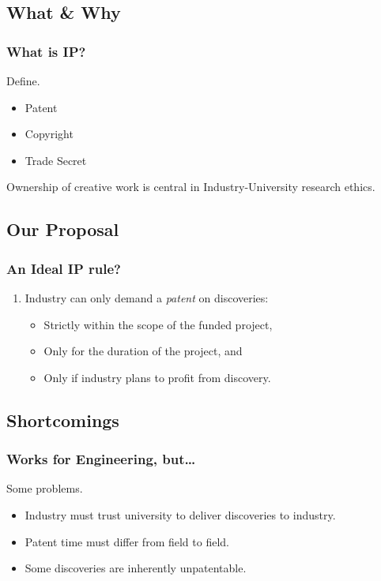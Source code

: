 \subsection{What \& Why}

\begin{frame}
  \frametitle{What is IP?}
  Define.
  \begin{itemize}
  \item Patent
  \item Copyright
  \item Trade Secret
  \end{itemize}
  Ownership of creative work is central in Industry-University research ethics.
\end{frame}

\subsection{Our Proposal}

\begin{frame}
  \frametitle{An Ideal IP rule?}
  \begin{enumerate}[1.]
  \item Industry can only demand a \emph{patent} on discoveries:
    \begin{itemize}
    \item Strictly within the scope of the funded project,
    \item Only for the duration of the project, and
    \item Only if industry plans to profit from discovery.
    \end{itemize}    
  \end{enumerate}
\end{frame}

\subsection{Shortcomings}

\begin{frame}
  \frametitle{Works for Engineering, but\ldots{}}
  Some problems.
  \begin{itemize}
  \item Industry must trust university to deliver discoveries to industry.
  \item Patent time must differ from field to field.
  \item Some discoveries are inherently unpatentable.
  \end{itemize}
\end{frame}